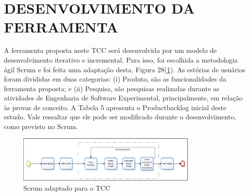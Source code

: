 \section{DESENVOLVIMENTO DA FERRAMENTA}
A ferramenta proposta neste TCC será  desenvolvida por um modelo de desenvolvimento iterativo e incremental. Para isso, foi escolhida a metodologia ágil  Scrum e foi feita uma adaptação desta, Figura 28(\ref{f28}). As estórias de usuários foram divididas em duas categorias: (i) Produto, são as funcionalidades da ferramenta proposta; e (ii) Pesquisa, são pesquisas realizadas durante as atividades de Engenharia de Software Experimental, principalmente, em relação às provas de conceito. A Tabela 5 apresenta o Productbacklog inicial deste estudo. Vale ressaltar que ele pode ser modificado durante o desenvolvimento, como previsto no Scrum.

\begin{figure}[h]
\centering
\label{f28}
\includegraphics[width=0.8\textwidth]{figuras/f28}
\caption{Scrum adaptado para o TCC}
\end{figure}

